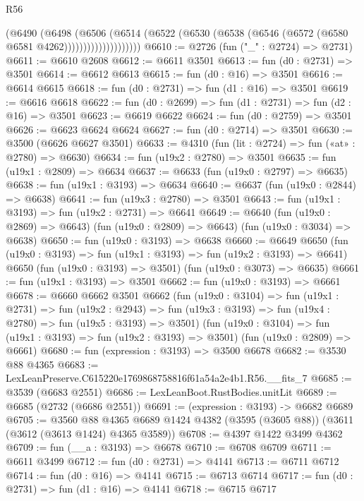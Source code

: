 \begin{lexlean}{R56}
\begin{coremodule}
                        (@6490
                          (@6498
                            (@6506
                              (@6514
                                (@6522
                                  (@6530 (@6538 (@6546 (@6572 (@6580 @6581 @4262))))))))))))))))))))
@6610 := @2726 (fun ("_" : @2724) => @2731)
@6611 := @6610 @2608
@6612 := @6611 @3501
@6613 := fun (d0 : @2731) => @3501
@6614 := @6612 @6613
@6615 := fun (d0 : @16) => @3501
@6616 := @6614 @6615
@6618 := fun (d0 : @2731) => fun (d1 : @16) => @3501
@6619 := @6616 @6618
@6622 := fun (d0 : @2699) => fun (d1 : @2731) => fun (d2 : @16) => @3501
@6623 := @6619 @6622
@6624 := fun (d0 : @2759) => @3501
@6626 := @6623 @6624 @6624
@6627 := fun (d0 : @2714) => @3501
@6630 := @3500 (@6626 @6627 @3501)
@6633 := @4310 (fun (lit : @2724) => fun («at» : @2780) => @6630)
@6634 := fun (u19x2 : @2780) => @3501
@6635 := fun (u19x1 : @2809) => @6634
@6637 := @6633 (fun (u19x0 : @2797) => @6635)
@6638 := fun (u19x1 : @3193) => @6634
@6640 := @6637 (fun (u19x0 : @2844) => @6638)
@6641 := fun (u19x3 : @2780) => @3501
@6643 := fun (u19x1 : @3193) => fun (u19x2 : @2731) => @6641
@6649 := @6640
    (fun (u19x0 : @2869) => @6643)
    (fun (u19x0 : @2809) => @6643)
    (fun (u19x0 : @3034) => @6638)
@6650 := fun (u19x0 : @3193) => @6638
@6660 := @6649
    @6650
    (fun (u19x0 : @3193) => fun (u19x1 : @3193) => fun (u19x2 : @3193) => @6641)
    @6650
    (fun (u19x0 : @3193) => @3501)
    (fun (u19x0 : @3073) => @6635)
@6661 := fun (u19x1 : @3193) => @3501
@6662 := fun (u19x0 : @3193) => @6661
@6678 := @6660
    @6662
    @3501
    @6662
    (fun (u19x0 : @3104) =>
    fun (u19x1 : @2731) =>
    fun (u19x2 : @2943) =>
    fun (u19x3 : @3193) => fun (u19x4 : @2780) => fun (u19x5 : @3193) => @3501)
    (fun (u19x0 : @3104) => fun (u19x1 : @3193) => fun (u19x2 : @3193) => @3501)
    (fun (u19x0 : @2809) => @6661)
@6680 := fun (expression : @3193) => @3500 @6678
@6682 := @3530 @88 @4365
@6683 := LexLeanPreserve.C615220e1769868758816f61a54a2e4b1.R56.__fits_7
@6685 := @3539 (@6683 @2551)
@6686 := LexLeanBoot.RustBodies.unitLit
@6689 := @6685 (@2732 (@6686 @2551))
@6691 := (expression : @3193) -> @6682 @6689
@6705 := @3560
    @88
    @4365
    @6689
    @1424
    @4382
    (@3595 (@3605 @88))
    (@3611 (@3612 (@3613 @1424) @4365 @3589))
@6708 := @4397 @1422 @3499 @4362
@6709 := fun (__a : @3193) => @6678
@6710 := @6708 @6709
@6711 := @6611 @3499
@6712 := fun (d0 : @2731) => @4141
@6713 := @6711 @6712
@6714 := fun (d0 : @16) => @4141
@6715 := @6713 @6714
@6717 := fun (d0 : @2731) => fun (d1 : @16) => @4141
@6718 := @6715 @6717

\end{coremodule}
\end{lexlean}
